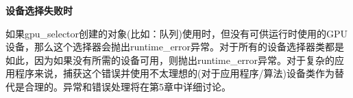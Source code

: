 \hspace*{\fill} \par %
\textbf{设备选择失败时}

如果gpu\_selector创建的对象(比如：队列)使用时，但没有可供运行时使用的GPU设备，那么这个选择器会抛出runtime\_error异常。对于所有的设备选择器类都是如此，因为如果没有所需的设备可用，则抛出runtime\_error异常。对于复杂的应用程序来说，捕获这个错误并使用不太理想的(对于应用程序/算法)设备类作为替代是合理的。异常和错误处理将在第5章中详细讨论。\par





